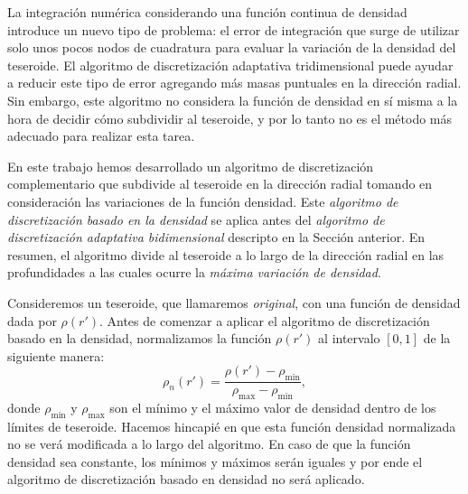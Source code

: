 La integración numérica considerando una función continua de densidad introduce
un nuevo tipo de problema: el error de integración que surge de utilizar solo
unos pocos nodos de cuadratura para evaluar la variación de la densidad del
teseroide.
El algoritmo de discretización adaptativa tridimensional puede ayudar a reducir
este tipo de error agregando más masas puntuales en la dirección radial.
Sin embargo, este algoritmo no considera la función de densidad en sí misma
a la hora de decidir cómo subdividir al teseroide, y por lo tanto no es el
método más adecuado para realizar esta tarea.

En este trabajo hemos desarrollado un algoritmo de discretización
complementario que subdivide al teseroide en la dirección radial tomando en
consideración las variaciones de la función densidad.
Este \emph{algoritmo de discretización basado en la densidad} se aplica antes
del \emph{algoritmo de discretización adaptativa bidimensional} descripto en la
Sección anterior.
En resumen, el algoritmo divide al teseroide a lo largo de la dirección radial
en las profundidades a las cuales ocurre la \emph{máxima variación de
densidad}.

Consideremos un teseroide, que llamaremos \emph{original}, con una función de
densidad dada por $\rho(r')$.
Antes de comenzar a aplicar el algoritmo de discretización basado en la
densidad, normalizamos la función $\rho(r')$ al intervalo $[0, 1]$ de la
siguiente manera:
%
\begin{equation}
    \rho_n(r') =
    \frac{\rho(r') - \rho_\text{min}}{\rho_\text{max} - \rho_\text{min}},
\end{equation}
%
donde $\rho_\text{min}$ y $\rho_\text{max}$ son el mínimo y el máximo
valor de densidad dentro de los límites de teseroide.
Hacemos hincapié en que esta función densidad normalizada no se verá modificada
a lo largo del algoritmo.
En caso de que la función densidad sea constante, los mínimos y máximos serán
iguales y por ende el algoritmo de discretización basado en densidad no será
aplicado.


